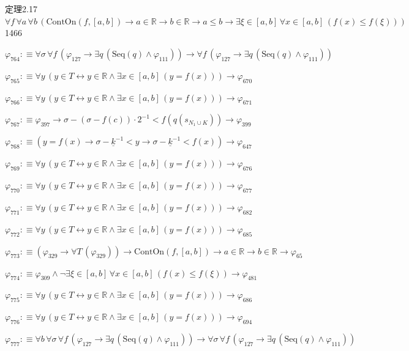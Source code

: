 \begin{fullproof}{定理2.17}{$\forall f\,\forall a\,\forall b\,(\mathrm{ContOn}(f,[a,b]) \to a \in \mathbb{R} \to b \in \mathbb{R} \to a \leq b \to \exists \xi \in [a,b]\,\forall x \in [a,b]\,(f(x) \leq f(\xi)))$}{1466}
\begin{abbrevlist}
\item $\varphi_{764} :\equiv \forall \sigma\,\forall f\,(\varphi_{127} \to \exists q\,(\mathrm{Seq}(q) \land \varphi_{111})) \to \forall f\,(\varphi_{127} \to \exists q\,(\mathrm{Seq}(q) \land \varphi_{111}))$
\item $\varphi_{765} :\equiv \forall y\,(y \in T \leftrightarrow y \in \mathbb{R} \land \exists x \in [a,b]\,(y = f(x))) \to \varphi_{670}$
\item $\varphi_{766} :\equiv \forall y\,(y \in T \leftrightarrow y \in \mathbb{R} \land \exists x \in [a,b]\,(y = f(x))) \to \varphi_{671}$
\item $\varphi_{767} :\equiv \varphi_{397} \to \sigma - (\sigma - f(c)) \cdot 2^{-1} < f(q(s_{N_{1} \cup K})) \to \varphi_{399}$
\item $\varphi_{768} :\equiv (y = f(x) \to \sigma - \underline{k}^{-1} < y \to \sigma - \underline{k}^{-1} < f(x)) \to \varphi_{647}$
\item $\varphi_{769} :\equiv \forall y\,(y \in T \leftrightarrow y \in \mathbb{R} \land \exists x \in [a,b]\,(y = f(x))) \to \varphi_{676}$
\item $\varphi_{770} :\equiv \forall y\,(y \in T \leftrightarrow y \in \mathbb{R} \land \exists x \in [a,b]\,(y = f(x))) \to \varphi_{677}$
\item $\varphi_{771} :\equiv \forall y\,(y \in T \leftrightarrow y \in \mathbb{R} \land \exists x \in [a,b]\,(y = f(x))) \to \varphi_{682}$
\item $\varphi_{772} :\equiv \forall y\,(y \in T \leftrightarrow y \in \mathbb{R} \land \exists x \in [a,b]\,(y = f(x))) \to \varphi_{685}$
\item $\varphi_{773} :\equiv (\varphi_{329} \to \forall T\,(\varphi_{329})) \to \mathrm{ContOn}(f,[a,b]) \to a \in \mathbb{R} \to b \in \mathbb{R} \to \varphi_{65}$
\item $\varphi_{774} :\equiv \varphi_{309} \land \neg \exists \xi \in [a,b]\,\forall x \in [a,b]\,(f(x) \leq f(\xi)) \to \varphi_{481}$
\item $\varphi_{775} :\equiv \forall y\,(y \in T \leftrightarrow y \in \mathbb{R} \land \exists x \in [a,b]\,(y = f(x))) \to \varphi_{686}$
\item $\varphi_{776} :\equiv \forall y\,(y \in T \leftrightarrow y \in \mathbb{R} \land \exists x \in [a,b]\,(y = f(x))) \to \varphi_{694}$
\item $\varphi_{777} :\equiv \forall b\,\forall \sigma\,\forall f\,(\varphi_{127} \to \exists q\,(\mathrm{Seq}(q) \land \varphi_{111})) \to \forall \sigma\,\forall f\,(\varphi_{127} \to \exists q\,(\mathrm{Seq}(q) \land \varphi_{111}))$

\end{abbrevlist}
\end{fullproof}
